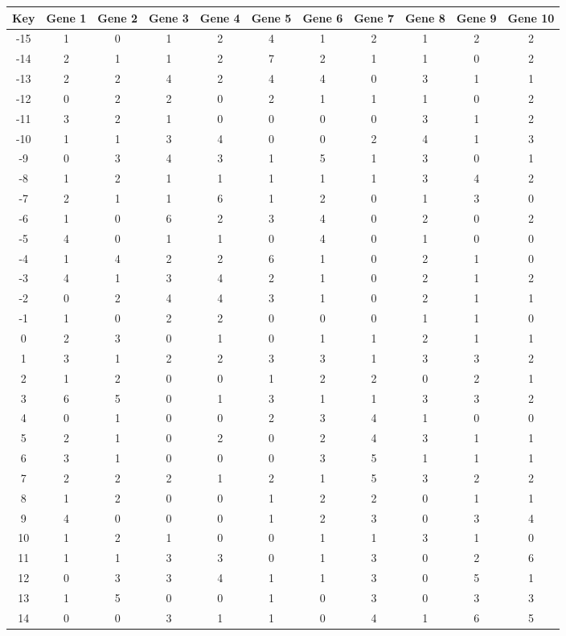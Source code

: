 \begin{tabular}{|c|c|c|c|c|c|c|c|c|c|c|}
\hline
Key & Gene 1 & Gene 2 & Gene 3 & Gene 4 & Gene 5 & Gene 6 & Gene 7 & Gene 8 & Gene 9 & Gene 10 \\
\hline
-15 & 1 & 0 & 1 & 2 & 4 & 1 & 2 & 1 & 2 & 2 \\
-14 & 2 & 1 & 1 & 2 & 7 & 2 & 1 & 1 & 0 & 2 \\
-13 & 2 & 2 & 4 & 2 & 4 & 4 & 0 & 3 & 1 & 1 \\
-12 & 0 & 2 & 2 & 0 & 2 & 1 & 1 & 1 & 0 & 2 \\
-11 & 3 & 2 & 1 & 0 & 0 & 0 & 0 & 3 & 1 & 2 \\
-10 & 1 & 1 & 3 & 4 & 0 & 0 & 2 & 4 & 1 & 3 \\
-9 & 0 & 3 & 4 & 3 & 1 & 5 & 1 & 3 & 0 & 1 \\
-8 & 1 & 2 & 1 & 1 & 1 & 1 & 1 & 3 & 4 & 2 \\
-7 & 2 & 1 & 1 & 6 & 1 & 2 & 0 & 1 & 3 & 0 \\
-6 & 1 & 0 & 6 & 2 & 3 & 4 & 0 & 2 & 0 & 2 \\
-5 & 4 & 0 & 1 & 1 & 0 & 4 & 0 & 1 & 0 & 0 \\
-4 & 1 & 4 & 2 & 2 & 6 & 1 & 0 & 2 & 1 & 0 \\
-3 & 4 & 1 & 3 & 4 & 2 & 1 & 0 & 2 & 1 & 2 \\
-2 & 0 & 2 & 4 & 4 & 3 & 1 & 0 & 2 & 1 & 1 \\
-1 & 1 & 0 & 2 & 2 & 0 & 0 & 0 & 1 & 1 & 0 \\
0 & 2 & 3 & 0 & 1 & 0 & 1 & 1 & 2 & 1 & 1 \\
1 & 3 & 1 & 2 & 2 & 3 & 3 & 1 & 3 & 3 & 2 \\
2 & 1 & 2 & 0 & 0 & 1 & 2 & 2 & 0 & 2 & 1 \\
3 & 6 & 5 & 0 & 1 & 3 & 1 & 1 & 3 & 3 & 2 \\
4 & 0 & 1 & 0 & 0 & 2 & 3 & 4 & 1 & 0 & 0 \\
5 & 2 & 1 & 0 & 2 & 0 & 2 & 4 & 3 & 1 & 1 \\
6 & 3 & 1 & 0 & 0 & 0 & 3 & 5 & 1 & 1 & 1 \\
7 & 2 & 2 & 2 & 1 & 2 & 1 & 5 & 3 & 2 & 2 \\
8 & 1 & 2 & 0 & 0 & 1 & 2 & 2 & 0 & 1 & 1 \\
9 & 4 & 0 & 0 & 0 & 1 & 2 & 3 & 0 & 3 & 4 \\
10 & 1 & 2 & 1 & 0 & 0 & 1 & 1 & 3 & 1 & 0 \\
11 & 1 & 1 & 3 & 3 & 0 & 1 & 3 & 0 & 2 & 6 \\
12 & 0 & 3 & 3 & 4 & 1 & 1 & 3 & 0 & 5 & 1 \\
13 & 1 & 5 & 0 & 0 & 1 & 0 & 3 & 0 & 3 & 3 \\
14 & 0 & 0 & 3 & 1 & 1 & 0 & 4 & 1 & 6 & 5 \\
\hline
\end{tabular}